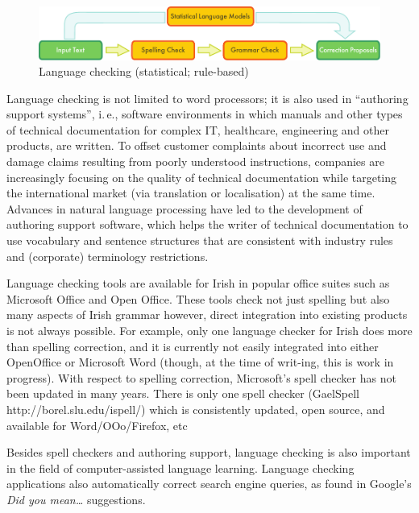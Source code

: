 \documentclass[]{../../metanetpaper}
\begin{document}
\begin{multicols}{2}
\begin{figure}[htb]
  \center
  \includegraphics[width=\textwidth]{../_media/english/language_checking}
  \caption{Language checking (statistical; rule-based)}
  \label{fig:langcheckingaarch_en}
\end{figure}

Language checking is not limited to word processors; it is also used in ``authoring support systems'', i.\,e., software environments in which manuals and other types of technical documentation for complex IT, healthcare, engineering and other products, are written. To offset customer complaints about incorrect use and damage claims resulting from poorly understood instructions, companies are increasingly focusing on the quality of technical documentation while targeting the international market (via translation or localisation) at the same time. Advances in natural language processing have led to the development of authoring support software, which helps the writer of technical documentation to use vocabulary and sentence structures that are consistent with industry rules and (corporate) terminology restrictions.


Language checking tools are available for Irish in popular office suites such as Microsoft Office and Open Office. These tools check not just spelling but also many aspects of Irish grammar however, direct integration into existing products is not always possible. For example, only one language checker for Irish \cite{gramadoir} does more than spelling correction, and it is currently not easily integrated into either OpenOffice or Microsoft Word (though, at the time of writ-ing, this is work in progress). With respect to spelling correction, Microsoft's spell checker has not been updated in many years.  There is only one spell checker (GaelSpell http://borel.slu.edu/ispell/) which is consistently updated, open source, and available for Word/OOo/Firefox, etc

Besides spell checkers and authoring support, language checking is also important in the field of computer-assisted language learning. Language checking applications also automatically correct search engine queries, as found in Google's \textit{Did you mean\ldots} suggestions.


\end{multicols}
\end{document}
